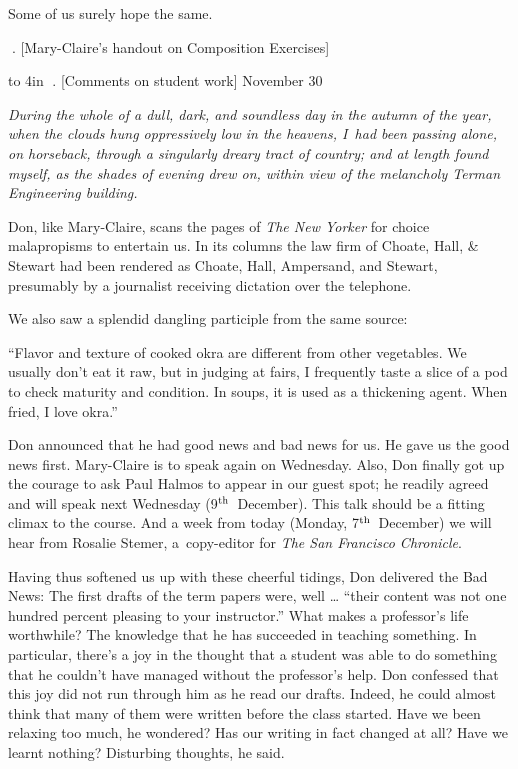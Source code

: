 Some of us surely hope the same.

. [Mary-Claire's handout on Composition Exercises]

\vbox to 4in{}
\vfill\eject
\null\vfill\eject
\null\vfill\eject
\null\vfill\eject
\null\vfill\eject
\null\vfill\eject
\null\vfill\eject
\null\vfill\eject
. [Comments on student work] \pmr November 30

{\narrower\smallskip\noindent
{\it During the whole of a dull, dark, and soundless day in the autumn
of the year, when the clouds hung oppressively low in the heavens, 
I~had been passing alone, on horseback, through a singularly dreary
tract of country; and at length found myself, as the shades of evening
drew on, within view of the melancholy Terman Engineering building.}
\smallskip}

Don, like Mary-Claire, scans the pages of {\sl The New Yorker\/} for
choice malapropisms to entertain us. In its columns the law firm of
Choate, Hall, \& Stewart had been rendered as Choate, Hall, Ampersand,
and Stewart, presumably by a journalist receiving dictation over the
telephone.

We also saw a splendid dangling participle from the same source:

{\narrower\smallskip\noindent
	      ``Flavor and texture of cooked okra are
		different from other vegetables. We 
		usually don't eat it raw, but in judging
		at fairs, I frequently taste a slice of
		a pod to check maturity and condition.
		In soups, it is used as a thickening
		agent. When fried, I love okra.''
\smallskip}

Don announced that he had good news and bad news for us. He gave us
the good news first. Mary-Claire is to speak again on Wednesday.
Also, Don finally got up the courage to ask Paul
Halmos to appear in our guest spot; he readily agreed and will speak
next Wednesday (9$^{\rm th}$~December). This talk should be a
fitting climax to the course.  And a week from today (Monday,
7$^{\rm th}$~December) we will hear from Rosalie Stemer, 
a~copy-editor for {\sl The San Francisco Chronicle\/}.

Having thus softened us up with these cheerful tidings, Don delivered
the Bad News: The first drafts of the term papers were, well \dots
``their content was not one hundred percent pleasing to your
instructor.'' What makes a professor's life worthwhile? The knowledge
that he has succeeded in teaching something. In particular, there's a
joy in the thought that a student was able to do something that he
couldn't have managed without the professor's help. Don confessed that
this joy did not run through him as he read our drafts.  Indeed, he
could almost think that many of them were written before the class
started. Have we been relaxing too much, he wondered?  Has our writing
in fact changed at all? Have we learnt nothing? Disturbing thoughts,
he said.

